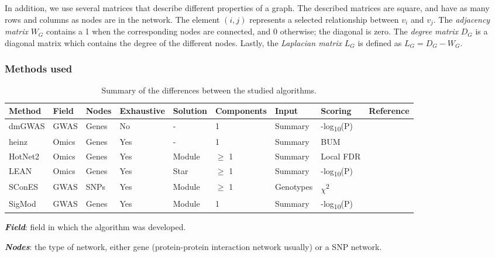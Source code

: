 \documentclass[twocolumn, 10pt]{article}
\begin{document}
In addition, we use several matrices that describe different properties of a graph. The described matrices are square, and have as many rows and columns as nodes are in the network. The element $(i,j)$ represents a  selected relationship between $v_i$ and $v_j$. The \emph{adjacency matrix} $W_G$ contains a 1 when the corresponding nodes are connected, and 0 otherwise; the diagonal is zero. The \emph{degree matrix} $D_G$ is a diagonal matrix which contains the degree of the different nodes. Lastly, the \emph{Laplacian matrix} $L_G$ is defined as $L_G = D_G - W_G$.

\subsubsection{Methods used}
\label{methods:methods}

\begin{table}[htbp]
  \caption{\label{tab:method_comparison} Summary of the differences between the studied algorithms.}
  \centering
  \begin{threeparttable}
    \begin{tabular}{l|llllllll}
      Method & Field & Nodes & Exhaustive & Solution & Components & Input & Scoring & Reference\\
      \hline
      dmGWAS & GWAS & Genes & No & - & 1 & Summary & -log\textsubscript{10}(P) & \cite{jia_dmgwas:_2011}\\
      heinz & Omics & Genes & Yes & - & 1 & Summary & BUM & \cite{dittrich_identifying_2008}\\
      HotNet2 & Omics & Genes & Yes & Module & \(\ge\) 1 & Summary & Local FDR & \cite{leiserson_pan-cancer_2015}\\
      LEAN & Omics & Genes & Yes & Star & \(\ge\) 1 & Summary & -log\textsubscript{10}(P) & \cite{gwinner_network-based_2016}\\
      SConES & GWAS & SNPs & Yes & Module & \(\ge\) 1 & Genotypes & \(\chi\)\textsuperscript{2} & \cite{azencott_efficient_2013}\\
      SigMod & GWAS & Genes & Yes & Module & 1 & Summary & -log\textsubscript{10}(P) & \cite{liu_sigmod:_2017}\\
    \end{tabular}
    \begin{tablenotes}
      \item \textbf{\emph{Field}}: field in which the algorithm was developed.\\
      \item \textbf{\emph{Nodes}}: the type of network, either gene (protein-protein interaction network usually) or a SNP network.\\

\end{tablenotes}
\end{threeparttable}
\end{table}
\end{document}
